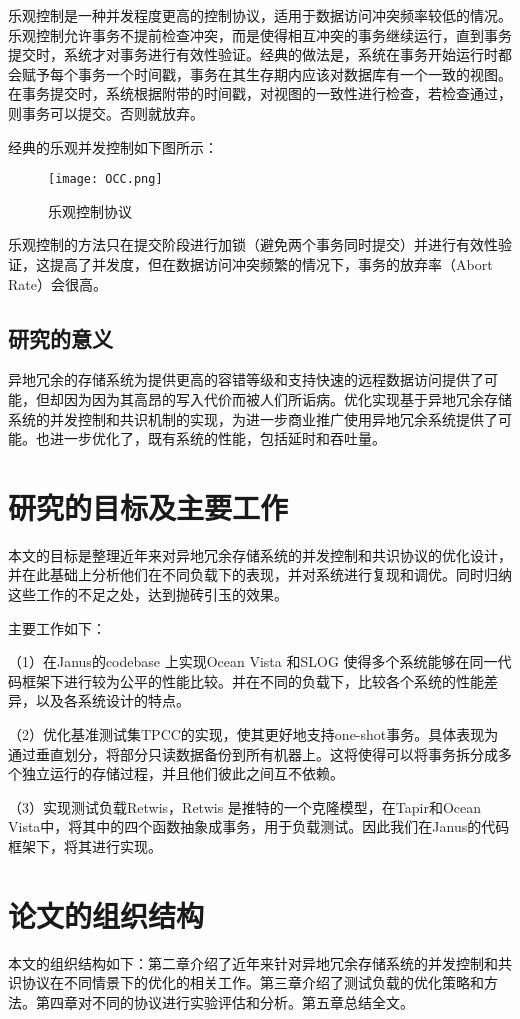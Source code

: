 乐观控制是一种并发程度更高的控制协议\cite{OCC}，适用于数据访问冲突频率较低的情况。乐观控制允许事务不提前检查冲突，而是使得相互冲突的事务继续运行，直到事务提交时，系统才对事务进行有效性验证。经典的做法是，系统在事务开始运行时都会赋予每个事务一个时间戳，事务在其生存期内应该对数据库有一个一致的视图。在事务提交时，系统根据附带的时间戳，对视图的一致性进行检查，若检查通过，则事务可以提交。否则就放弃。

经典的乐观并发控制如下图所示：
 
\begin{figure}[htb]
  \centering
  \texttt{[image: OCC.png]}
  \caption{乐观控制协议}
  \label{fig:badge}
\end{figure}

乐观控制的方法只在提交阶段进行加锁（避免两个事务同时提交）并进行有效性验证，这提高了并发度，但在数据访问冲突频繁的情况下，事务的放弃率（Abort Rate）会很高。

\subsection{研究的意义}

异地冗余的存储系统为提供更高的容错等级和支持快速的远程数据访问提供了可能，但却因为因为其高昂的写入代价而被人们所诟病。优化实现基于异地冗余存储系统的并发控制和共识机制的实现，为进一步商业推广使用异地冗余系统提供了可能。也进一步优化了，既有系统的性能，包括延时和吞吐量。



\section{研究的目标及主要工作}

本文的目标是整理近年来对异地冗余存储系统的并发控制和共识协议的优化设计，并在此基础上分析他们在不同负载下的表现，并对系统进行复现和调优。同时归纳这些工作的不足之处，达到抛砖引玉的效果。

主要工作如下：

（1）在Janus的codebase 上实现Ocean Vista 和SLOG 使得多个系统能够在同一代码框架下进行较为公平的性能比较。并在不同的负载下，比较各个系统的性能差异，以及各系统设计的特点。

（2）优化基准测试集TPCC的实现，使其更好地支持one-shot事务。具体表现为通过垂直划分，将部分只读数据备份到所有机器上。这将使得可以将事务拆分成多个独立运行的存储过程，并且他们彼此之间互不依赖。

（3）实现测试负载Retwis，Retwis 是推特的一个克隆模型，在Tapir和Ocean Vista中，将其中的四个函数抽象成事务，用于负载测试。因此我们在Janus的代码框架下，将其进行实现。



\section{论文的组织结构}

本文的组织结构如下：第二章介绍了近年来针对异地冗余存储系统的并发控制和共识协议在不同情景下的优化的相关工作。第三章介绍了测试负载的优化策略和方法。第四章对不同的协议进行实验评估和分析。第五章总结全文。


